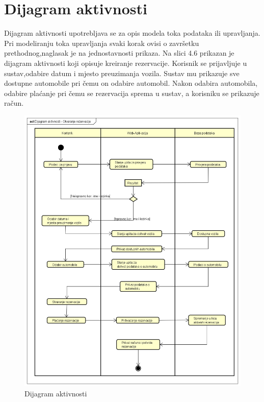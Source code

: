 		\section{Dijagram aktivnosti}
			
			\noindent Dijagram aktivnosti upotrebljava se za opis modela toka podataka ili upravljanja. Pri modeliranju toka upravljanja svaki korak ovisi o završetku prethodnog,naglasak je na jednostavnosti prikaza. Na slici 4.6 prikazan je dijagram aktivnosti koji opisuje kreiranje rezervacije. Korisnik se prijavljuje u sustav,odabire datum i mjesto preuzimanja vozila. Sustav mu prikazuje sve dostupne automobile pri čemu on odabire automobil. Nakon odabira automobila, odabire plaćanje pri čemu se rezervacija sprema u sustav, a korisniku se prikazuje račun.
			
			\begin{figure}[hp]
                    \centering
                    \includegraphics[width=16cm]{slike/Dijagram_aktivnosti.png}
                    \caption{Dijagram aktivnosti}
                    \label{fig:DA_01}
                \end{figure}
			
